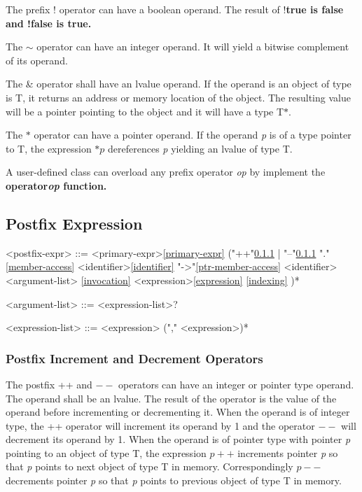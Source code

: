 \documentclass[a4paper,oneside,11pt]{article}
\begin{document}
The prefix ! operator can have a boolean operand. The result of !\bf{true} is \bf{false} and !\bf{false} is \bf{true}.

The $\sim$ operator can have an integer operand. It will yield a bitwise complement of its operand.

The \& operator shall have an lvalue operand.
If the operand is an object of type is T, it returns an address or memory location of the object.
The resulting value will be a pointer pointing to the object and it will have a type T$*$.

The $*$ operator can have a pointer operand. If the operand \emph{p} is of a type pointer to T,
the expression $*p$ dereferences \emph{p} yielding an lvalue of type T.

A user-defined class can overload any prefix operator \emph{op} by implement the \bf{operator\emph{op}} function.

\subsection{Postfix Expression}

\begin{grammar}
\label{postfix-expr}<postfix-expr> ::= <primary-expr>\ref{primary-expr}
("++"\ref{postfix-inc-dec} | "--"\ref{postfix-inc-dec}
\alt "."\ref{member-access} <identifier>\ref{identifier}
\alt "->"\ref{ptr-member-access} <identifier>
\alt \lit{(} <argument-list> \lit{)}\ref{invocation}
\alt \lit{[} <expression>\ref{expression} \lit{]}\ref{indexing}
)*

\label{argument-list}<argument-list> ::= <expression-list>?

\label{expression-list}<expression-list> ::= <expression> ("," <expression>)*

\end{grammar}

\subsubsection{Postfix Increment and Decrement Operators}\label{postfix-inc-dec}

The postfix ++ and $--$ operators can have an integer or pointer type operand. The operand shall be an lvalue.
The result of the operator is the value of the operand before incrementing or decrementing it.
When the operand is of integer type, the ++ operator will increment its operand by 1 and the operator $--$ will decrement its operand by 1.
When the operand is of pointer type with pointer \emph{p} pointing to an object of type T,
the expression $p++$ increments pointer \emph{p} so that \emph{p} points to next object of type T in memory.
Correspondingly $p--$ decrements pointer \emph{p} so that \emph{p} points to previous object of type T in memory.
\end{document}
